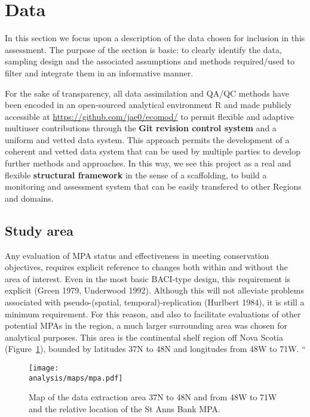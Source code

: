 \documentclass[letterpaper,portrait,11pt]{scrartcl}
\numberwithin{equation}{section}		%
\numberwithin{figure}{section}		%
\numberwithin{table}{section}				%
\newcommand{\ecomod}{\string~/ecomod_data/}   %
\newcommand{\analysis}{\ecomod/mpa/analysis/}   %
\begin{document}
\section{Data} 

In this section we focus upon a description of the data chosen for inclusion in this assessment. The purpose of the section is basic: to clearly identify the data, sampling design and the associated assumptions and methods required/used to filter and integrate them in an informative manner. 

For the sake of transparency, all data assimilation and QA/QC methods have been encoded in an open-sourced analytical environment R \cite{rCran} and made publicly accessible at \url{https://github.com/jae0/ecomod/} to permit flexible and adaptive multiuser contributions through the \textbf{Git revision control system} and a uniform and vetted data system. This approach permits the development of a coherent and vetted data system that can be used by multiple parties to develop further methods and approaches. In this way, we see this project as a real and flexible \textbf{structural framework} in the sense of a scaffolding, to build a monitoring and assessment system that can be easily transfered to other Regions and domains. 


\subsection{Study area}
Any evaluation of MPA status and effectiveness in meeting conservation objectives, requires explicit reference to changes both within and without the area of interest. Even in the most basic BACI-type design, this requirement is explicit (Green 1979, Underwood 1992). Although this will not alleviate problems associated with pseudo-(spatial, temporal)-replication (Hurlbert 1984), it is still a minimum requirement. For this reason, and also to facilitate evaluations of other potential MPAs in the region, a much larger surrounding area was chosen for analytical purposes. This area is the continental shelf region off Nova Scotia (Figure~\ref{fig:SAB}), bounded by latitudes 37N to 48N and longitudes from 48W to 71W.  ``

\begin{figure}[h]
  \label{fig:SAB}
  \centering
  \texttt{[image: \\analysis/maps/mpa.pdf]}
  \caption{Map of the data extraction area 37N to 48N and from 48W to 71W and the relative location of the St Anns Bank MPA.}
\end{figure}
\end{document}
